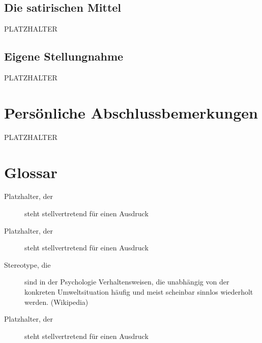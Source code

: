 \documentclass[12pt,a4paper]{scrartcl}
\begin{document}
\subsection{Die satirischen Mittel} 
PLATZHALTER

\subsection{Eigene Stellungnahme} 
PLATZHALTER

\section{Persönliche Abschlussbemerkungen}
PLATZHALTER




\newpage
\section{Glossar}
\begin{description}

\item[Platzhalter, der] steht stellvertretend für einen Ausdruck
%
\item[Platzhalter, der] steht stellvertretend für einen Ausdruck
%
\item[Stereotype, die] sind in der Psychologie Verhaltensweisen, die unabhängig von der konkreten Umweltsituation häufig und meist scheinbar sinnlos wiederholt werden. (Wikipedia)
%
\item[Platzhalter, der] steht stellvertretend für einen Ausdruck
%
\end{description}
\end{document}
